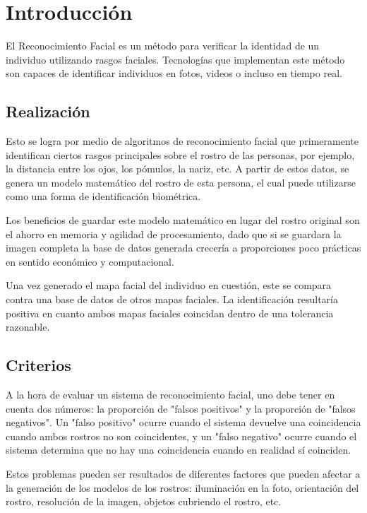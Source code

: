 \chapter{Introducción}

El Reconocimiento Facial es un método para verificar la identidad de un individuo utilizando rasgos faciales. Tecnologías que implementan este método son capaces de identificar individuos en fotos, videos o incluso en tiempo real.

\section{Realización}

Esto se logra por medio de algoritmos de reconocimiento facial que primeramente identifican ciertos rasgos principales sobre el rostro de las personas, por ejemplo, la distancia entre los ojos, los pómulos, la nariz, etc. A partir de estos datos, se genera un modelo matemático del rostro de esta persona, el cual puede utilizarse como una forma de identificación biométrica.

Los beneficios de guardar este modelo matemático en lugar del rostro original son el ahorro en memoria y agilidad de procesamiento, dado que si se guardara la imagen completa la base de datos generada crecería a proporciones poco prácticas en sentido económico y computacional.

Una vez generado el mapa facial del individuo en cuestión, este se compara contra una base de datos de otros mapas faciales. La identificación resultaría positiva en cuanto ambos mapas faciales coincidan dentro de una tolerancia razonable.

\section{Criterios}

A la hora de evaluar un sistema de reconocimiento facial, uno debe tener en cuenta dos números: la proporción de "falsos positivos" y la proporción de "falsos negativos". Un "falso positivo" ocurre cuando el sistema devuelve una coincidencia cuando ambos rostros no son coincidentes, y un "falso negativo" ocurre cuando el sistema determina que no hay una coincidencia cuando en realidad sí coinciden.

Estos problemas pueden ser resultados de diferentes factores que pueden afectar a la generación de los modelos de los rostros: iluminación en la foto, orientación del rostro, resolución de la imagen, objetos cubriendo el rostro, etc.